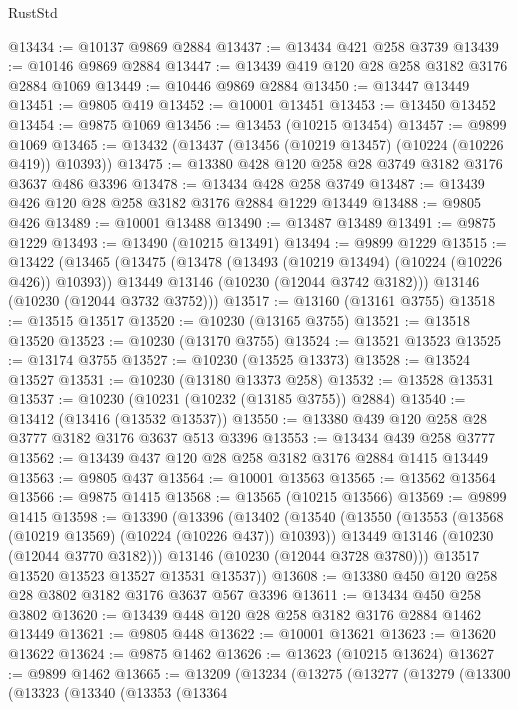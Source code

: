 \begin{lexlean}{RustStd}
\begin{coremodule}
@13434 := @10137 @9869 @2884
@13437 := @13434 @421 @258 @3739
@13439 := @10146 @9869 @2884
@13447 := @13439 @419 @120 @28 @258 @3182 @3176 @2884 @1069
@13449 := @10446 @9869 @2884
@13450 := @13447 @13449
@13451 := @9805 @419
@13452 := @10001 @13451
@13453 := @13450 @13452
@13454 := @9875 @1069
@13456 := @13453 (@10215 @13454)
@13457 := @9899 @1069
@13465 := @13432 (@13437 (@13456 (@10219 @13457) (@10224 (@10226 @419)) @10393))
@13475 := @13380 @428 @120 @258 @28 @3749 @3182 @3176 @3637 @486 @3396
@13478 := @13434 @428 @258 @3749
@13487 := @13439 @426 @120 @28 @258 @3182 @3176 @2884 @1229 @13449
@13488 := @9805 @426
@13489 := @10001 @13488
@13490 := @13487 @13489
@13491 := @9875 @1229
@13493 := @13490 (@10215 @13491)
@13494 := @9899 @1229
@13515 := @13422
    (@13465
      (@13475
        (@13478 (@13493 (@10219 @13494) (@10224 (@10226 @426)) @10393))
        @13449
        @13146
        (@10230 (@12044 @3742 @3182)))
      @13146
      (@10230 (@12044 @3732 @3752)))
@13517 := @13160 (@13161 @3755)
@13518 := @13515 @13517
@13520 := @10230 (@13165 @3755)
@13521 := @13518 @13520
@13523 := @10230 (@13170 @3755)
@13524 := @13521 @13523
@13525 := @13174 @3755
@13527 := @10230 (@13525 @13373)
@13528 := @13524 @13527
@13531 := @10230 (@13180 @13373 @258)
@13532 := @13528 @13531
@13537 := @10230 (@10231 (@10232 (@13185 @3755)) @2884)
@13540 := @13412 (@13416 (@13532 @13537))
@13550 := @13380 @439 @120 @258 @28 @3777 @3182 @3176 @3637 @513 @3396
@13553 := @13434 @439 @258 @3777
@13562 := @13439 @437 @120 @28 @258 @3182 @3176 @2884 @1415 @13449
@13563 := @9805 @437
@13564 := @10001 @13563
@13565 := @13562 @13564
@13566 := @9875 @1415
@13568 := @13565 (@10215 @13566)
@13569 := @9899 @1415
@13598 := @13390
    (@13396
      (@13402
        (@13540
          (@13550
            (@13553 (@13568 (@10219 @13569) (@10224 (@10226 @437)) @10393))
            @13449
            @13146
            (@10230 (@12044 @3770 @3182)))
          @13146
          (@10230 (@12044 @3728 @3780)))
        @13517
        @13520
        @13523
        @13527
        @13531
        @13537))
@13608 := @13380 @450 @120 @258 @28 @3802 @3182 @3176 @3637 @567 @3396
@13611 := @13434 @450 @258 @3802
@13620 := @13439 @448 @120 @28 @258 @3182 @3176 @2884 @1462 @13449
@13621 := @9805 @448
@13622 := @10001 @13621
@13623 := @13620 @13622
@13624 := @9875 @1462
@13626 := @13623 (@10215 @13624)
@13627 := @9899 @1462
@13665 := @13209
    (@13234
      (@13275
        (@13277
          (@13279
            (@13300
              (@13323
                (@13340
                  (@13353
                    (@13364

\end{coremodule}
\end{lexlean}
